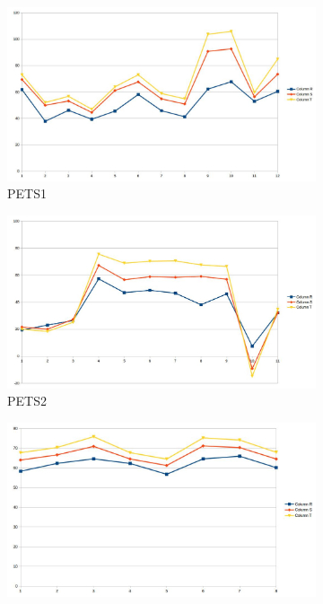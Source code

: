 \documentclass[12pt]{report}
\begin{document}
\begin{figure}
  \centering
  \begin{subfigure}{.49\linewidth}
  \includegraphics[width=1\linewidth]{figures/rgshift_pets1.jpg}
  \caption{PETS1}
\end{subfigure}
\hfill
\begin{subfigure}{.49\linewidth}
  \includegraphics[width=1\linewidth]{figures/rgshift_pets2.jpg}
  \caption{PETS2}
\end{subfigure}
\hfill
\begin{subfigure}{.49\linewidth}
  \includegraphics[width=1\linewidth]{figures/rgshift_highway1.jpg}

\end{subfigure}
\end{figure}
\end{document}
